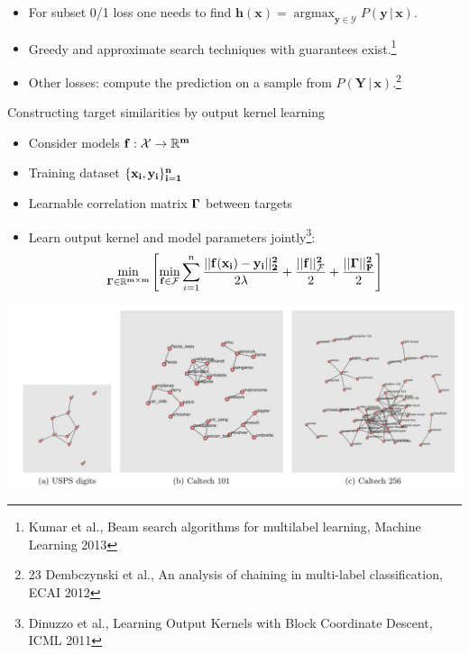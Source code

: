 \documentclass[]{beamer}
\renewcommand{\Pr}{P}
\renewcommand{\vec}[1]{\boldsymbol{#1}}
\newcommand{\given}{\, | \,}
\DeclareMathOperator*{\argmax}{\arg \max}
\newcommand{\bx}{\boldsymbol{x}}
\newcommand{\by}{\boldsymbol{y}}
\newcommand{\bh}{\boldsymbol{h}}
\newcommand{\calY}{\mathcal{Y}}
\begin{document}
\begin{frame}[fragile]
\vspace{-0.4cm}
\begin{itemize}
\item For subset 0/1 loss one needs to find $
\bh(\bx) = \argmax_{\by \in \calY} \Pr(\by \given \bx)
$.
\item Greedy and approximate search techniques with guarantees exist.\footnote{Kumar et al., Beam search algorithms for multilabel
learning, Machine Learning 2013}
\item Other losses: compute the prediction on a sample from $\Pr(\vec{Y} \given  \vec{x})$.\footnote{23 Dembczynski et al., An analysis of chaining
in multi-label classification, ECAI 2012}
\end{itemize}

\end{frame}

\begin{frame}{Constructing target similarities by output kernel learning}

\begin{itemize}
\item Consider models $\bf{f}: \mathcal{X} \rightarrow \mathbb{R}^m$
\item Training dataset $\{\bf{x}_i,\bf{y}_i\}_{i=1}^n$
\item Learnable correlation matrix $\bf{\Gamma}$ between targets
\item Learn output kernel and model parameters jointly\footnote{Dinuzzo et al., Learning Output Kernels with Block Coordinate Descent, ICML 2011}:
$$\min_{\bf{\Gamma} \in \mathbb{R}^{m \times m}} \left[ \min_{\bf{f} \in \mathcal{F}} \sum_{i=1}^n \frac{||\bf{f}(\bf{x}_i) - \bf{y}_i||_2^2}{2\lambda} + \frac{||\bf{f}||^2_\mathcal{F}}{2} + \frac{
||\bf{\Gamma}||^2_F}{2} \right]$$
\end{itemize}
\begin{center}
\includegraphics[scale=0.2]{Figures/okl}
\end{center}

\end{frame}
\end{document}
